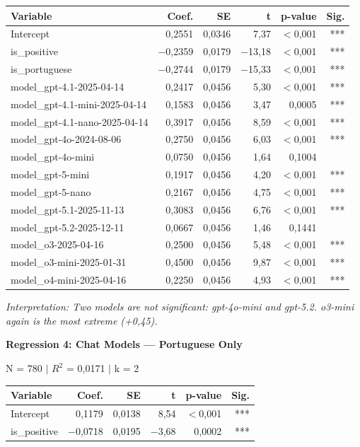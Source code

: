 \documentclass[jair,11pt,letterpaper]{article}
\begin{document}
\begin{table}[H]
\centering
\small
\begin{tabular}{lrrrrr}
\toprule
\textbf{Variable} & \textbf{Coef.} & \textbf{SE} & \textbf{t} & \textbf{p-value} & \textbf{Sig.} \\
\midrule
Intercept & 0,2551 & 0,0346 & 7,37 & $<$0,001 & *** \\
is\_positive & $-$0,2359 & 0,0179 & $-$13,18 & $<$0,001 & *** \\
is\_portuguese & $-$0,2744 & 0,0179 & $-$15,33 & $<$0,001 & *** \\
model\_gpt-4.1-2025-04-14 & 0,2417 & 0,0456 & 5,30 & $<$0,001 & *** \\
model\_gpt-4.1-mini-2025-04-14 & 0,1583 & 0,0456 & 3,47 & 0,0005 & *** \\
model\_gpt-4.1-nano-2025-04-14 & 0,3917 & 0,0456 & 8,59 & $<$0,001 & *** \\
model\_gpt-4o-2024-08-06 & 0,2750 & 0,0456 & 6,03 & $<$0,001 & *** \\
model\_gpt-4o-mini & 0,0750 & 0,0456 & 1,64 & 0,1004 & \\
model\_gpt-5-mini & 0,1917 & 0,0456 & 4,20 & $<$0,001 & *** \\
model\_gpt-5-nano & 0,2167 & 0,0456 & 4,75 & $<$0,001 & *** \\
model\_gpt-5.1-2025-11-13 & 0,3083 & 0,0456 & 6,76 & $<$0,001 & *** \\
model\_gpt-5.2-2025-12-11 & 0,0667 & 0,0456 & 1,46 & 0,1441 & \\
model\_o3-2025-04-16 & 0,2500 & 0,0456 & 5,48 & $<$0,001 & *** \\
model\_o3-mini-2025-01-31 & 0,4500 & 0,0456 & 9,87 & $<$0,001 & *** \\
model\_o4-mini-2025-04-16 & 0,2250 & 0,0456 & 4,93 & $<$0,001 & *** \\
\bottomrule
\end{tabular}
\end{table}

\noindent\textit{Interpretation: Two models are not significant: gpt-4o-mini and
gpt-5.2. o3-mini again is the most extreme (+0,45).}

\vspace{0.5cm}
\noindent\textbf{Regression 4: Chat Models --- Portuguese Only}

\noindent N = 780 $|$ $R^2$ = 0,0171 $|$ k = 2

\begin{table}[H]
\centering
\begin{tabular}{lrrrrr}
\toprule
\textbf{Variable} & \textbf{Coef.} & \textbf{SE} & \textbf{t} & \textbf{p-value} & \textbf{Sig.} \\
\midrule
Intercept & 0,1179 & 0,0138 & 8,54 & $<$0,001 & *** \\
is\_positive & $-$0,0718 & 0,0195 & $-$3,68 & 0,0002 & *** \\
\bottomrule
\end{tabular}
\end{table}
\end{document}
